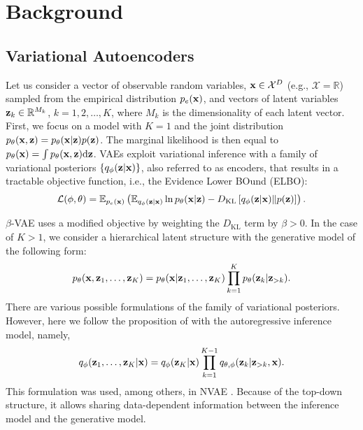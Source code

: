 

\section{Background}

\subsection{Variational Autoencoders}
Let us consider a vector of observable random variables, ${\mathbf{x}} \in \mathcal{X}^{D}$ (e.g., $\mathcal{X} = \mathbb{R}$) sampled from  the empirical distribution $p_{e}(\mathbf{{\mathbf{x}}})$, and vectors of latent variables ${\mathbf{z}}_{k} \in \mathbb{R}^{M_{k}}$, $k=1, 2, \ldots, K$, where $M_k$ is the dimensionality of each latent vector. First, we focus on a model with $K=1$ and the joint distribution $p_{\theta}({\mathbf{x}}, {\mathbf{z}}) = {p_{\theta}({\mathbf{x}}|{\mathbf{z}})} p({\mathbf{z}})$. The marginal likelihood is then equal to $p_{\theta}({\mathbf{x}}) = \int p_{\theta}({\mathbf{x}}, {\mathbf{z}}) \mathrm{d} {\mathbf{z}}$. VAEs exploit variational inference \cite{jordan1999introduction} with a family of variational posteriors $\{{q_{\phi}({\mathbf{z}}|{\mathbf{x}})}\}$, also referred to as encoders, that results in a tractable objective function, i.e., the Evidence Lower BOund (ELBO): 
 \begin{align}
     \mathcal{L}(\phi, \theta)
     = \mathbb{E}_{p_{e}(\mathbf{{\mathbf{x}}})}\left( \mathbb{E}_{{q_{\phi}({\mathbf{z}}|{\mathbf{x}})}}\ln {p_{\theta}({\mathbf{x}}|{\mathbf{z}})} - D_{\mathrm{KL}}\left[{q_{\phi}({\mathbf{z}}|{\mathbf{x}})}\|p({\mathbf{z}})\right] \right).
 \end{align}

$\beta$-VAE \cite{higgins2016beta} uses a modified objective by weighting the $D_{\text{KL}}$ term by $\beta > 0$.
In the case of $K>1$, we consider a hierarchical latent structure with the generative model of the following form: 
\begin{equation}
    p_{\theta}({\mathbf{x}}, {\mathbf{z}}_1, \ldots, {\mathbf{z}}_K) = {p_{\theta}({\mathbf{x}}|{\mathbf{z}}_1, \ldots, {\mathbf{z}}_K)} \prod_{k=1}^{K}{p_{\theta}({\mathbf{z}}_{k}|{\mathbf{z}}_{>k})}.
\end{equation}
There are various possible formulations of the family of variational posteriors. However, here we follow the proposition of \citet{So_nderby2016-en} with the autoregressive inference model, namely, $${q_{\phi}({\mathbf{z}}_1, \ldots, {\mathbf{z}}_K|{\mathbf{x}})} = {q_{\phi}({\mathbf{z}}_K|{\mathbf{x}})}\prod_{k=1}^{K-1}{q_{\theta, \phi}({\mathbf{z}}_k|{\mathbf{z}}_{>k}, {\mathbf{x}})}.$$
This formulation was used, among others, in NVAE \citep{vahdat2020nvae}. Because of the top-down structure, it allows sharing data-dependent information between the inference model and the generative model.


